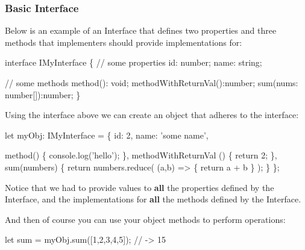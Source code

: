 \documentclass[12pt,]{article}
\newenvironment{Shaded}{}{}
\newcommand{\KeywordTok}[1]{\textcolor[rgb]{0.00,0.00,1.00}{{#1}}}
\newcommand{\DataTypeTok}[1]{{#1}}
\newcommand{\DecValTok}[1]{{#1}}
\newcommand{\CommentTok}[1]{\textcolor[rgb]{0.00,0.50,0.00}{{#1}}}
\newcommand{\FunctionTok}[1]{{#1}}
\newcommand{\NormalTok}[1]{{#1}}
\begin{document}
\subsubsection{Basic Interface}\label{basic-interface}

Below is an example of an Interface that defines two properties and
three methods that implementers should provide implementations for:

\begin{Shaded}
\begin{Highlighting}[numbers=left,,]
\KeywordTok{interface} \NormalTok{IMyInterface \{}
  \CommentTok{// some properties}
  \NormalTok{id: number;}
  \NormalTok{name: string;}

  \CommentTok{// some methods}
  \FunctionTok{method}\NormalTok{(): }\DataTypeTok{void}\NormalTok{;}
  \FunctionTok{methodWithReturnVal}\NormalTok{():number;}
  \FunctionTok{sum}\NormalTok{(nums: number[]):number;}
\NormalTok{\}}
\end{Highlighting}
\end{Shaded}

Using the interface above we can create an object that adheres to the
interface:

\begin{Shaded}
\begin{Highlighting}[numbers=left,,]
\NormalTok{let myObj: IMyInterface = \{}
  \NormalTok{id: }\DecValTok{2}\NormalTok{,}
  \NormalTok{name: 'some name',}

  \FunctionTok{method}\NormalTok{() \{ console.}\FunctionTok{log}\NormalTok{('hello'); \},}
  \FunctionTok{methodWithReturnVal} \NormalTok{() \{ }\KeywordTok{return} \DecValTok{2}\NormalTok{; \},}
  \FunctionTok{sum}\NormalTok{(numbers) \{}
    \KeywordTok{return} \NormalTok{numbers.}\FunctionTok{reduce}\NormalTok{( (a,b) => \{ }\KeywordTok{return} \NormalTok{a + b \} );}
  \NormalTok{\}}
\NormalTok{\};}
\end{Highlighting}
\end{Shaded}

Notice that we had to provide values to \textbf{all} the properties
defined by the Interface, and the implementations for \textbf{all} the
methods defined by the Interface.

And then of course you can use your object methods to perform
operations:

\begin{Shaded}
\begin{Highlighting}[numbers=left,,]
\NormalTok{let sum = myObj.}\FunctionTok{sum}\NormalTok{([}\DecValTok{1}\NormalTok{,}\DecValTok{2}\NormalTok{,}\DecValTok{3}\NormalTok{,}\DecValTok{4}\NormalTok{,}\DecValTok{5}\NormalTok{]); }\CommentTok{// -> 15}
\end{Highlighting}
\end{Shaded}
\end{document}
